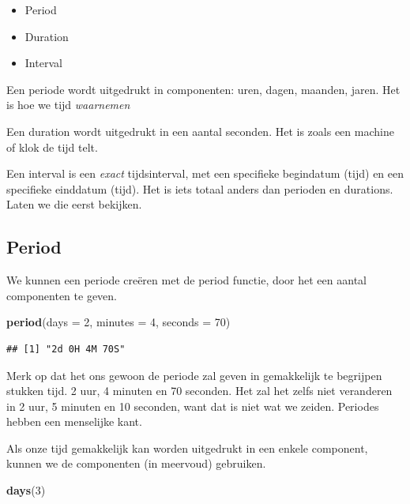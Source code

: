 \documentclass[]{tufte-book}
\newenvironment{Shaded}{}{}
\newcommand{\DataTypeTok}[1]{\textcolor[rgb]{0.56,0.13,0.00}{#1}}
\newcommand{\DecValTok}[1]{\textcolor[rgb]{0.25,0.63,0.44}{#1}}
\newcommand{\KeywordTok}[1]{\textcolor[rgb]{0.00,0.44,0.13}{\textbf{#1}}}
\newcommand{\NormalTok}[1]{#1}
\providecommand{\tightlist}{%
  \setlength{\itemsep}{0pt}\setlength{\parskip}{0pt}}
\begin{document}
\begin{itemize}
\tightlist
\item
  Period
\item
  Duration
\item
  Interval
\end{itemize}

Een periode wordt uitgedrukt in componenten: uren, dagen, maanden, jaren. Het is hoe we tijd \emph{waarnemen}

Een duration wordt uitgedrukt in een aantal seconden. Het is zoals een machine of klok de tijd telt.

Een interval is een \emph{exact} tijdsinterval, met een specifieke begindatum (tijd) en een specifieke einddatum (tijd). Het is iets totaal anders dan perioden en durations. Laten we die eerst bekijken.

\hypertarget{period-1}{%
\subsection{Period}\label{period-1}}

We kunnen een periode creëren met de period functie, door het een aantal componenten te geven.

\begin{Shaded}
\begin{Highlighting}[]
\KeywordTok{period}\NormalTok{(}\DataTypeTok{days =} \DecValTok{2}\NormalTok{, }\DataTypeTok{minutes =} \DecValTok{4}\NormalTok{, }\DataTypeTok{seconds =} \DecValTok{70}\NormalTok{)}
\end{Highlighting}
\end{Shaded}

\begin{verbatim}
## [1] "2d 0H 4M 70S"
\end{verbatim}

Merk op dat het ons gewoon de periode zal geven in gemakkelijk te begrijpen stukken tijd. 2 uur, 4 minuten en 70 seconden. Het zal het zelfs niet veranderen in 2 uur, 5 minuten en 10 seconden, want dat is niet wat we zeiden. Periodes hebben een menselijke kant.

Als onze tijd gemakkelijk kan worden uitgedrukt in een enkele component, kunnen we de componenten (in meervoud) gebruiken.

\begin{Shaded}
\begin{Highlighting}[]
\KeywordTok{days}\NormalTok{(}\DecValTok{3}\NormalTok{)}
\end{Highlighting}
\end{Shaded}
\end{document}
